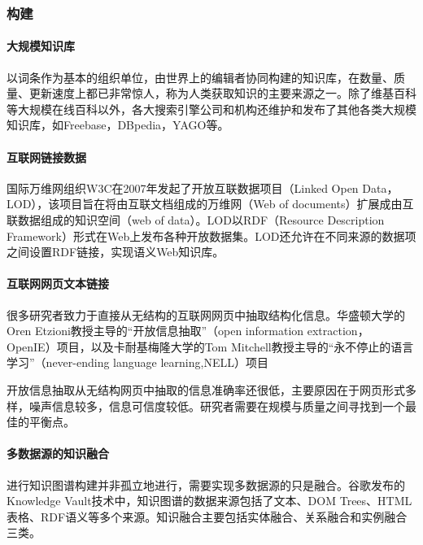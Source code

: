 \documentclass[UTF8]{ctexart}
\begin{document}
\subsubsection{构建}
\paragraph{大规模知识库}
以词条作为基本的组织单位，由世界上的编辑者协同构建的知识库，在数量、质量、更新速度上都已非常惊人，称为人类获取知识的主要来源之一。除了维基百科等大规模在线百科以外，各大搜索引擎公司和机构还维护和发布了其他各类大规模知识库，如Freebase，DBpedia，YAGO等。
\paragraph{互联网链接数据}
国际万维网组织W3C在2007年发起了开放互联数据项目（Linked Open Data，LOD），该项目旨在将由互联文档组成的万维网（Web of documents）扩展成由互联数据组成的知识空间（web of data）。LOD以RDF（Resource Description Framework）形式在Web上发布各种开放数据集。LOD还允许在不同来源的数据项之间设置RDF链接，实现语义Web知识库。
\paragraph{互联网网页文本链接}
很多研究者致力于直接从无结构的互联网网页中抽取结构化信息。华盛顿大学的Oren Etzioni教授主导的“开放信息抽取”（open information extraction， OpenIE）项目，以及卡耐基梅隆大学的Tom Mitchell教授主导的“永不停止的语言学习”（never-ending language learning,NELL）项目

开放信息抽取从无结构网页中抽取的信息准确率还很低，主要原因在于网页形式多样，噪声信息较多，信息可信度较低。研究者需要在规模与质量之间寻找到一个最佳的平衡点。
\paragraph{多数据源的知识融合}
进行知识图谱构建并非孤立地进行，需要实现多数据源的只是融合。谷歌发布的Knowledge Vault技术中，知识图谱的数据来源包括了文本、DOM Trees、HTML表格、RDF语义等多个来源。知识融合主要包括实体融合、关系融合和实例融合三类。
\end{document}
